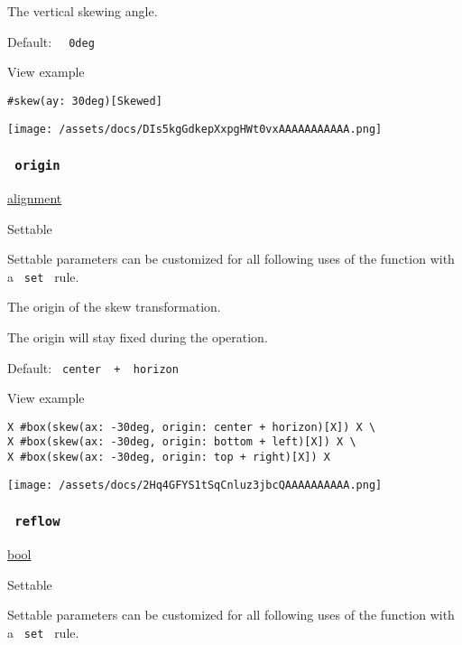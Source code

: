 The vertical skewing angle.

Default: \texttt{\ }{\texttt{\ 0deg\ }}\texttt{\ }


View example

\begin{verbatim}
#skew(ay: 30deg)[Skewed]
\end{verbatim}

\texttt{[image: /assets/docs/DIs5kgGdkepXxpgHWt0vxAAAAAAAAAAA.png]}

\subsubsection{\texorpdfstring{\texttt{\ origin\ }}{ origin }}\label{parameters-origin}

\href{/docs/reference/layout/alignment/}{alignment}

{{ Settable }}

\label{parameters-origin-settable-tooltip}
Settable parameters can be customized for all following uses of the
function with a \texttt{\ set\ } rule.

The origin of the skew transformation.

The origin will stay fixed during the operation.

Default: \texttt{\ center\ }{\texttt{\ +\ }}\texttt{\ horizon\ }


View example

\begin{verbatim}
X #box(skew(ax: -30deg, origin: center + horizon)[X]) X \
X #box(skew(ax: -30deg, origin: bottom + left)[X]) X \
X #box(skew(ax: -30deg, origin: top + right)[X]) X
\end{verbatim}

\texttt{[image: /assets/docs/2Hq4GFYS1tSqCnluz3jbcQAAAAAAAAAA.png]}

\subsubsection{\texorpdfstring{\texttt{\ reflow\ }}{ reflow }}\label{parameters-reflow}

\href{/docs/reference/foundations/bool/}{bool}

{{ Settable }}

\label{parameters-reflow-settable-tooltip}
Settable parameters can be customized for all following uses of the
function with a \texttt{\ set\ } rule.

